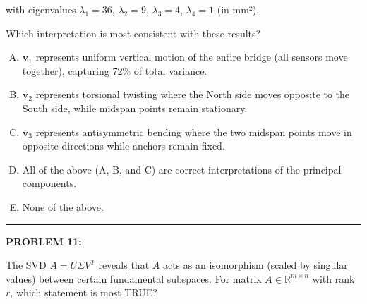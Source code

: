 \documentclass[12pt]{amsart}
\newcommand{\divider}{
  \vspace{-1em} %
  \noindent
  \raisebox{-0.15ex}{\textbullet}%
  \hspace{0.5em}%
  \rule[0.5ex]{0.95\textwidth}{1.0pt}%
  \hspace{0.5em}%
  \raisebox{-0.15ex}{\textbullet}%
  \vspace{0em} %
}
\begin{document}
with eigenvalues $\lambda_1 = 36$, $\lambda_2 = 9$, $\lambda_3 = 4$, $\lambda_4 = 1$ (in mm²).

Which interpretation is most consistent with these results?

\begin{enumerate}[(A)]
\item $\mathbf{v}_1$ represents uniform vertical motion of the entire bridge (all sensors move together), capturing 72\% of total variance.
\item $\mathbf{v}_2$ represents torsional twisting where the North side moves opposite to the South side, while midspan points remain stationary.
\item $\mathbf{v}_3$ represents antisymmetric bending where the two midspan points move in opposite directions while anchors remain fixed.
\item All of the above (A, B, and C) are correct interpretations of the principal components.
\item None of the above.
\end{enumerate}


\divider 



{\bf PROBLEM 11:}

The SVD $A = U\Sigma V^T$ reveals that $A$ acts as an isomorphism (scaled by singular values) between certain fundamental subspaces. For matrix $A \in \mathbb{R}^{m \times n}$ with rank $r$, which statement is most TRUE?
\end{document}
